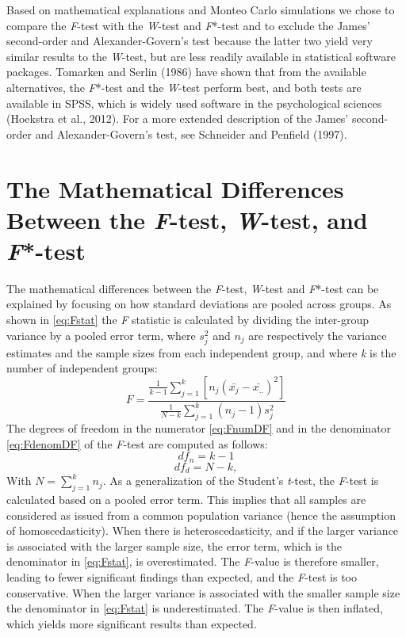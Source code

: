 \documentclass[man,floatsintext]{apa6}
\begin{document}
Based on mathematical explanations and Monteo Carlo simulations we chose to compare the \emph{F}-test with the \emph{W}-test and \emph{F}*-test and to exclude the James' second-order and Alexander-Govern's test because the latter two yield very similar results to the \emph{W}-test, but are less readily available in statistical software packages. Tomarken and Serlin (1986) have shown that from the available alternatives, the \emph{F}*-test and the \emph{W}-test perform best, and both tests are available in SPSS, which is widely used software in the psychological sciences (Hoekstra et al., 2012). For a more extended description of the James' second-order and Alexander-Govern's test, see Schneider and Penfield (1997).

\hypertarget{the-mathematical-differences-between-the-f-test-w-test-and-f-test}{%
\section{\texorpdfstring{The Mathematical Differences Between the \emph{F}-test, \emph{W}-test, and \emph{F}*-test}{The Mathematical Differences Between the F-test, W-test, and F*-test}}\label{the-mathematical-differences-between-the-f-test-w-test-and-f-test}}

The mathematical differences between the \emph{F}-test, \emph{W}-test and \emph{F}*-test can be explained by focusing on how standard deviations are pooled across groups. As shown in \eqref{eq:Fstat} the \emph{F} statistic is calculated by dividing the inter-group variance by a pooled error term, where \(s_{j}^2\) and \(n_{j}\) are respectively the variance estimates and the sample sizes from each independent group, and where \emph{k} is the number of independent groups:
\begin{equation} 
F=\frac{\frac{1}{k-1}\sum_{j=1}^k [n_j(\bar{x_{j}}-\bar{x_{..}})^2]}{\frac{1}{N-k}\sum_{j=1}^k(n_j-1)s_j^2}
\label{eq:Fstat}
\end{equation}
The degrees of freedom in the numerator \eqref{eq:FnumDF} and in the denominator \eqref{eq:FdenomDF} of the \emph{F}-test are computed as follows:
\begin{equation} 
df_n=k-1
\label{eq:FnumDF}
\end{equation}
\begin{equation} 
df_d= N-k, 
\label{eq:FdenomDF}
\end{equation}
With \(N=\sum_{j=1}^k n_j\). As a generalization of the Student's \emph{t}-test, the \emph{F}-test is calculated based on a pooled error term. This implies that all samples are considered as issued from a common population variance (hence the assumption of homoscedasticity). When there is heteroscedasticity, and if the larger variance is associated with the larger sample size, the error term, which is the denominator in \eqref{eq:Fstat}, is overestimated. The \emph{F}-value is therefore smaller, leading to fewer significant findings than expected, and the \emph{F}-test is too conservative. When the larger variance is associated with the smaller sample size the denominator in \eqref{eq:Fstat} is underestimated. The \emph{F}-value is then inflated, which yields more significant results than expected.
\end{document}
